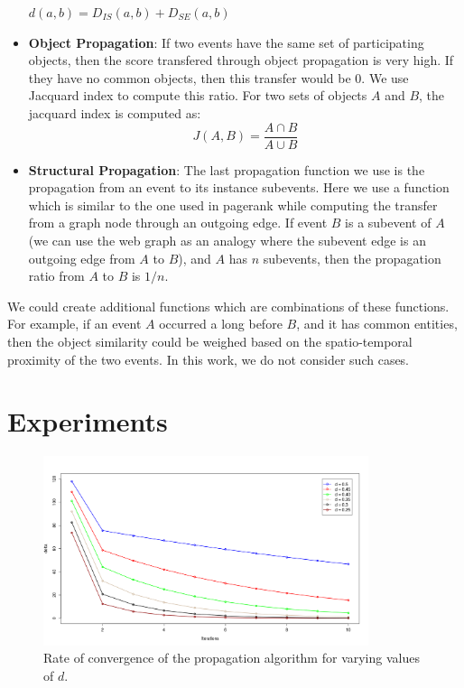 \begin{itemize}
$d(a, b) = D_{IS}(a, b) + D_{SE}(a, b)$

\item \textbf{Object Propagation}: If two events have the same set of participating objects, then the score transfered through object propagation is very high. If they have no common objects, then this transfer would be 0. We use Jacquard index to compute this ratio. For two sets of objects $A$ and $B$, the jacquard index is computed as:
\begin{equation}
J(A, B) = \frac{A \cap B}{A \cup B} \nonumber
\end{equation}

\item \textbf{Structural Propagation}: The last propagation function we use is the propagation from an event to its instance subevents. Here we use a function which is similar to the one used in pagerank while computing the transfer from a graph node through an outgoing edge. If event $B$ is a subevent of $A$ (we can use the web graph as an analogy where the subevent edge is an outgoing edge from $A$ to $B$), and $A$ has $n$ subevents, then the propagation ratio from $A$ to $B$ is $1/n$.

\end{itemize}

We could create additional functions which are combinations of these functions. For example, if an event $A$ occurred a long before $B$, and it has common entities, then the object similarity could be weighed based on the spatio-temporal proximity of the two events. In this work, we do not consider such cases.

\section{Experiments}

\begin{figure}[t]
\centering
\includegraphics[width=0.85\textwidth]{media/chapter6/convergences.png}
\caption{Rate of convergence of the propagation algorithm for varying values of $d$.}
\label{fig:convergences}
\end{figure}

